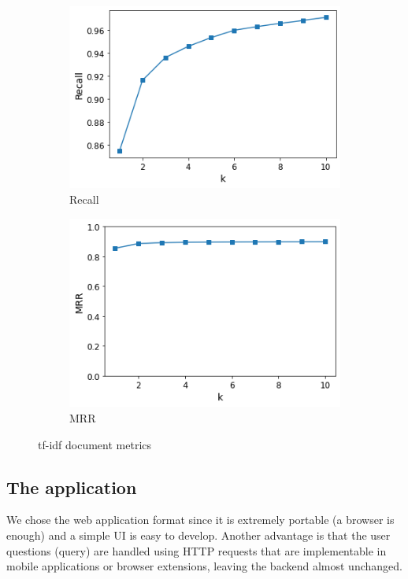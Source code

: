 \documentclass{article}
\begin{document}
\begin{figure}
     \centering
     \begin{subfigure}[b]{0.49\textwidth}
         \centering
         \includegraphics[width=\textwidth]{doc_recall.png}
         \caption{Recall}
         \label{fig:metrics - recall}
     \end{subfigure}
     \hfill
     \begin{subfigure}[b]{0.49\textwidth}
         \centering
         \includegraphics[width=\textwidth]{doc_mrr.png}
         \caption{MRR}
         \label{fig:metrics - mrr}
     \end{subfigure}
     \hfill
        \caption{tf-idf document metrics}
        \label{IR doc metrics}
\end{figure}


\subsection{The application}
We chose the web application format since it is extremely portable (a browser is enough) and a simple UI is easy to develop.
Another advantage is that the user questions (query) are handled using HTTP requests that are implementable in mobile applications or browser extensions, leaving the backend almost unchanged.
\end{document}
